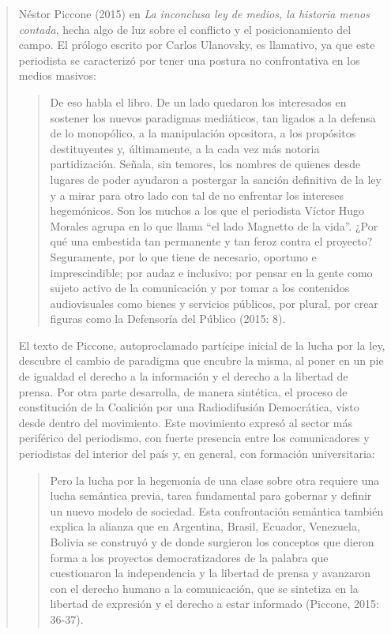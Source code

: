 \begin{quote}
Néstor Piccone (2015) en \emph{La inconclusa ley de medios, la historia menos contada}, hecha algo de luz sobre el conflicto y el posicionamiento del campo. El prólogo escrito por Carlos Ulanovsky, es llamativo, ya que este periodista se caracterizó por tener una postura no confrontativa en los medios masivos:

\begin{quote}
	De eso habla el libro. De un lado quedaron los interesados en sostener los nuevos paradigmas mediáticos, tan ligados a la defensa de lo monopólico, a la manipulación opositora, a los propósitos destituyentes y, últimamente, a la cada vez más notoria partidización. Señala, sin temores, los nombres de quienes desde lugares de poder ayudaron a postergar la sanción definitiva de la ley y a mirar para otro lado con tal de no enfrentar los intereses hegemónicos. Son los muchos a los que el periodista Víctor Hugo Morales agrupa en lo que llama \enquote{el lado Magnetto de la vida}. ¿Por qué una embestida tan permanente y tan feroz contra el proyecto? Seguramente, por lo que tiene de necesario, oportuno e imprescindible; por audaz e inclusivo; por pensar en la gente como sujeto activo de la comunicación y por tomar a los contenidos audiovisuales como bienes y servicios públicos, por plural, por crear figuras como la Defensoría del Público (2015: 8).
\end{quote}


El texto de Piccone, autoproclamado partícipe inicial de la lucha por la ley, descubre el cambio de paradigma que encubre la misma, al poner en un pie de igualdad el derecho a la información y el derecho a la libertad de prensa. Por otra parte desarrolla, de manera sintética, el proceso de constitución de la Coalición por una Radiodifusión Democrática, visto desde dentro del movimiento. Este movimiento expresó  al sector más periférico del periodismo, con fuerte presencia entre los comunicadores y periodistas del interior del país y, en general, con formación universitaria:

\begin{quote}
	Pero la lucha por la hegemonía de una clase sobre otra requiere una lucha semántica previa, tarea fundamental para gobernar y definir un nuevo modelo de sociedad. Esta confrontación semántica también explica la alianza que en Argentina, Brasil, Ecuador, Venezuela, Bolivia se construyó y de donde surgieron los conceptos que dieron forma a los proyectos democratizadores de la palabra que cuestionaron la independencia y la libertad de prensa y avanzaron con el derecho humano a la comunicación, que se sintetiza en la libertad de expresión y el derecho a estar informado (Piccone, 2015: 36-37).
\end{quote}



\end{quote}
